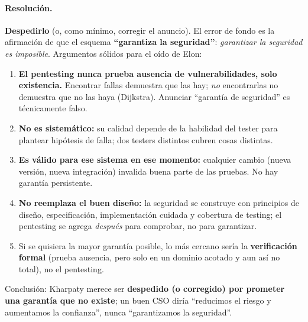\paragraph{Resolución.}
\textbf{Despedirlo} (o, como mínimo, corregir el anuncio). El error de fondo es la afirmación
de que el esquema \textbf{``garantiza la seguridad''}: \emph{garantizar la seguridad es
imposible}. Argumentos sólidos para el oído de Elon:
\begin{enumerate}
  \item \textbf{El pentesting nunca prueba ausencia de vulnerabilidades, solo existencia.}
  Encontrar fallas demuestra que las hay; \emph{no} encontrarlas no demuestra que no las
  haya (Dijkstra). Anunciar ``garantía de seguridad'' es técnicamente falso.
  \item \textbf{No es sistemático:} su calidad depende de la habilidad del tester para
  plantear hipótesis de falla; dos testers distintos cubren cosas distintas.
  \item \textbf{Es válido para ese sistema en ese momento:} cualquier cambio (nueva versión,
  nueva integración) invalida buena parte de las pruebas. No hay garantía persistente.
  \item \textbf{No reemplaza el buen diseño:} la seguridad se construye con principios de
  diseño, especificación, implementación cuidada y cobertura de testing; el pentesting se
  agrega \emph{después} para comprobar, no para garantizar.
  \item Si se quisiera la mayor garantía posible, lo más cercano sería la \textbf{verificación
  formal} (prueba ausencia, pero solo en un dominio acotado y aun así no total), no el
  pentesting.
\end{enumerate}
Conclusión: Kharpaty merece ser \textbf{despedido (o corregido) por prometer una garantía que
no existe}; un buen CSO diría ``reducimos el riesgo y aumentamos la confianza'', nunca
``garantizamos la seguridad''.
